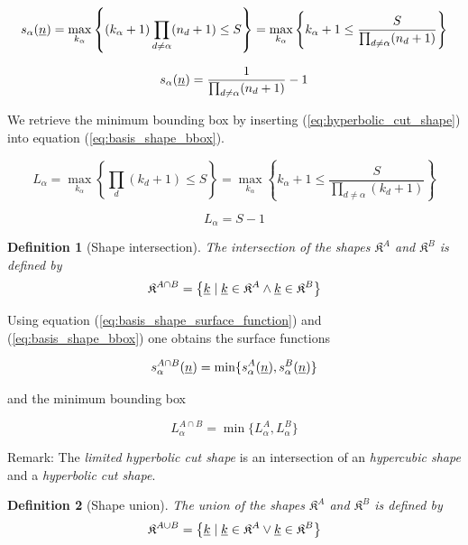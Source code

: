 \documentclass{article}
\newtheorem{definition}{Definition}
\begin{document}
\[
  s_{\alpha}(\underline{n})=
  \max_{k_{\alpha}}\left\{(k_{\alpha}+1)\prod_{d \neq \alpha} (n_d+1) \leq S \right\} =
  \max_{k_{\alpha}}\left\{k_{\alpha}+1 \leq \frac{S}{\prod_{d \neq \alpha}(n_d+1)}\right\}
\]

\begin{equation}
s_{\alpha}(\underline{n})=\frac{1}{\prod_{d \neq \alpha} (n_d+1)}-1
\end{equation}

We retrieve the minimum bounding box by inserting (\ref{eq:hyperbolic_cut_shape}) into
equation (\ref{eq:basis_shape_bbox}).

\[
  L_{\alpha}=\max_{k_{\alpha}}\left\{\prod_d(k_d+1) \leq S\right\} =
  \max_{k_{\alpha}}\left\{k_{\alpha}+1 \leq \frac{S}{\prod_{d \neq \alpha}(k_d+1)}\right\}
\]

\begin{equation}
L_{\alpha}=S-1
\end{equation}

\begin{definition}[Shape intersection]
  The intersection of the shapes \(\mathfrak{K}^{A}\) and \(\mathfrak{K}^{B}\) is defined by
  \begin{equation}
    \label{eq:basis_shape_intersection}
    \mathfrak{K}^{A \cap B}=\left\{\underline{k} \;|\; \underline{k} \in \mathfrak{K}^A \land
      \underline{k} \in \mathfrak{K}^B
    \right\}
  \end{equation}
\end{definition}

Using equation (\ref{eq:basis_shape_surface_function}) and (\ref{eq:basis_shape_bbox})
one obtains the surface functions

\begin{equation}
  s_{\alpha}^{A \cap B}(\underline{n}) = \min\{s_{\alpha}^A(\underline{n}), s_{\alpha}^B(\underline{n})\}
\end{equation}

and the minimum bounding box

\begin{equation}
  L_{\alpha}^{A \cap B} = \min\{L_{\alpha}^{A}, L_{\alpha}^{B}\}
\end{equation}

Remark: The \emph{limited hyperbolic cut shape} is an intersection of an
\emph{hypercubic shape} and a \emph{hyperbolic cut shape}.

\begin{definition}[Shape union]
  The union of the shapes \(\mathfrak{K}^{A}\) and \(\mathfrak{K}^{B}\) is defined by
  \begin{equation}
    \label{eq:basis_shape_intersection}
    \mathfrak{K}^{A \cup B}=\left\{\underline{k} \;|\; \underline{k} \in \mathfrak{K}^A \lor
      \underline{k} \in \mathfrak{K}^B
    \right\}
  \end{equation}
\end{definition}
\end{document}
